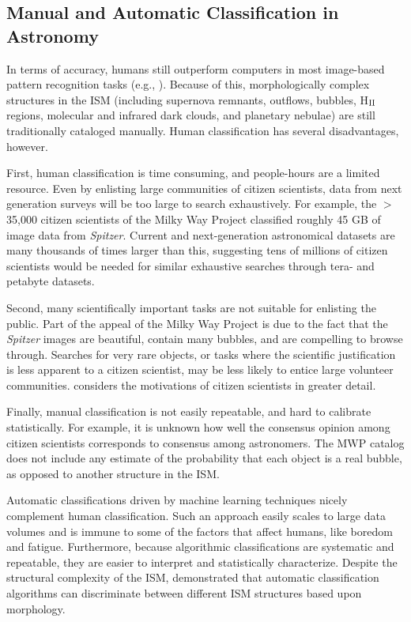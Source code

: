 \documentclass[preprint]{aastex}
\newcommand{\hii}[0]{H$_{\rm II}$}
\begin{document}
\subsection{Manual and Automatic Classification in Astronomy}
\label{sec:benefits}

In terms of accuracy, humans still outperform computers in most image-based pattern recognition tasks (e.g., \citealt{Zhang10}). Because of this, morphologically complex structures in the ISM (including supernova remnants, outflows, bubbles, \hii\, regions, molecular and infrared dark clouds, and planetary nebulae) are still traditionally cataloged manually. Human classification has several disadvantages, however.

First, human classification is time consuming, and people-hours are a limited resource. Even by enlisting large communities of citizen scientists, data from next generation surveys will be too large to search exhaustively. For example, the $>$ 35,000 citizen scientists of the Milky Way Project classified roughly 45 GB of image data from \emph{Spitzer}. Current and next-generation astronomical datasets are many thousands of times larger than this, suggesting tens of millions of citizen scientists would be needed for similar exhaustive searches through tera- and petabyte datasets.

Second, many scientifically important tasks are not suitable for enlisting the public. Part of the appeal of the Milky Way Project is due to the fact that the \emph{Spitzer} images are beautiful, contain many bubbles, and are compelling to browse through. Searches for very rare objects, or tasks where the scientific justification is less apparent to a citizen scientist, may be less likely to entice large volunteer communities. \cite{Raddick13} considers the motivations of citizen scientists in greater detail.

Finally, manual classification is not easily repeatable, and hard to calibrate statistically. For example, it is unknown how well the consensus opinion among citizen scientists corresponds to consensus among astronomers. The MWP catalog does not include any estimate of the probability that each object is a real bubble, as opposed to another structure in the ISM. 

Automatic classifications driven by machine learning techniques nicely complement human classification. Such an approach easily scales to large data volumes and is immune to some of the factors that affect humans, like boredom and fatigue. Furthermore, because algorithmic classifications are systematic and repeatable, they are easier to interpret and statistically characterize. Despite the structural complexity of the ISM, \cite{Beaumont11} demonstrated that automatic classification algorithms can discriminate between different ISM structures based upon morphology.
\end{document}
